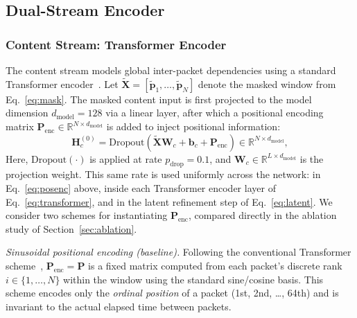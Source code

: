 \subsection{Dual-Stream Encoder}
\subsubsection{Content Stream: Transformer Encoder}
The content stream models global inter-packet dependencies using a standard Transformer encoder~\cite{vaswani2017attention}. Let $\tilde{\mathbf{X}} = [\tilde{\mathbf{p}}_1, \ldots, \tilde{\mathbf{p}}_N]$ denote the masked window from Eq.~\eqref{eq:mask}. The masked content input is first projected to the model dimension $d_{\text{model}} = 128$ via a linear layer, after which a positional encoding matrix $\mathbf{P}_{\text{enc}} \in \mathbb{R}^{N \times d_{\text{model}}}$ is added to inject positional information:
\begin{equation}
    \mathbf{H}^{(0)}_c = \text{Dropout}\!\left( \tilde{\mathbf{X}}\mathbf{W}_c + \mathbf{b}_c + \mathbf{P}_{\text{enc}} \right) \in \mathbb{R}^{N \times d_{\text{model}}},
    \label{eq:posenc}
\end{equation}
Here, $\text{Dropout}(\cdot)$ is applied at rate $p_{\text{drop}} = 0.1$, and $\mathbf{W}_c \in \mathbb{R}^{L \times d_{\text{model}}}$ is the projection weight. This same rate is used uniformly across the network: in Eq.~\eqref{eq:posenc} above, inside each Transformer encoder layer of Eq.~\eqref{eq:transformer}, and in the latent refinement step of Eq.~\eqref{eq:latent}. We consider two schemes for instantiating $\mathbf{P}_{\text{enc}}$, compared directly in the ablation study of Section~\ref{sec:ablation}.

\noindent\textit{Sinusoidal positional encoding (baseline).} Following the conventional Transformer scheme~\cite{vaswani2017attention}, $\mathbf{P}_{\text{enc}} = \mathbf{P}$ is a fixed matrix computed from each packet's discrete rank $i \in \{1, \ldots, N\}$ within the window using the standard sine/cosine basis. This scheme encodes only the \emph{ordinal position} of a packet (1st, 2nd, \ldots, 64th) and is invariant to the actual elapsed time between packets.


